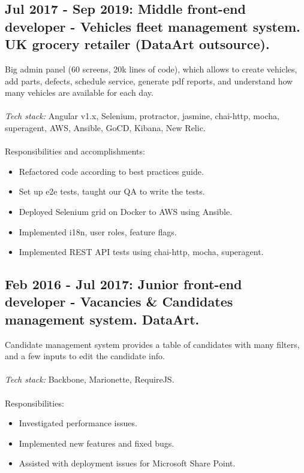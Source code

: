 \documentclass[a4paper, 14pt]{article}
\begin{document}
  \subsection{Jul 2017 - Sep 2019: Middle front-end developer - Vehicles fleet management system. UK grocery retailer (DataArt outsource).
}
  Big admin panel (60 screens, 20k lines of code), which allows to create vehicles, add parts, defects, schedule service, generate pdf reports, and understand how many vehicles are available for each day. \\
  \\
  \textit{Tech stack:} Angular v1.x, Selenium, protractor, jasmine, chai-http, mocha, superagent, AWS, Ansible, GoCD, Kibana, New Relic.
  \\
  \\
  Responsibilities and accomplishments:
    \begin{itemize}
      \item Refactored code according to best practices guide. \\
      \item Set up e2e tests, taught our QA to write the tests. \\
      \item Deployed Selenium grid on Docker to AWS using Ansible. \\
      \item Implemented i18n, user roles, feature flags. \\
      \item Implemented REST API tests using chai-http, mocha, superagent. \\
    \end{itemize}

  \subsection{Feb 2016 - Jul 2017: Junior front-end developer - Vacancies \& Candidates management system. DataArt.}
  Candidate management system provides a table of candidates with many filters, and a few inputs to edit the candidate info. \\
  \\
    \textit{Tech stack:} Backbone, Marionette, RequireJS. \\
  \\
  Responsibilities:
    \begin{itemize}
      \item Investigated performance issues. \\
      \item Implemented new features and fixed bugs. \\
      \item Assisted with deployment issues for Microsoft Share Point.
    \end{itemize}
\end{document}
